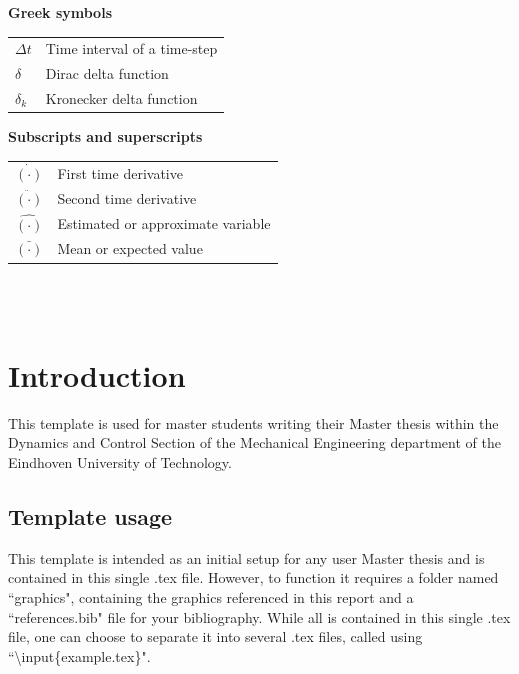 \documentclass[11pt]{report}
\numberwithin{equation}{chapter}		%
\numberwithin{figure}{chapter}			%
\numberwithin{table}{chapter}			%
\begin{document}
	\vspace{0.5cm}
	\noindent\textbf{Greek symbols}\\[3mm]
	\begin{tabularx}{\textwidth}{p{2.5cm}X}
		$\Delta t$         & Time interval of a time-step                   \\
		$\delta$           & Dirac delta function                           \\
		$\delta_k$         & Kronecker delta function                       
	\end{tabularx}

	\vspace{0.5cm}
	\noindent\textbf{Subscripts and superscripts}\\[3mm]
	\begin{tabularx}{\textwidth}{p{2.5cm}X}
		$\dot{(\cdot)}$    & First time derivative                          \\
		$\ddot{(\cdot)}$   & Second time derivative                         \\
		$\hat{(\cdot)}$    & Estimated or approximate variable              \\
		$\bar{(\cdot)}$    & Mean or expected value                         
	\end{tabularx}\\


	\newpage
	\thispagestyle{empty} \ \newpage

	\chapter{Introduction} \label{ch:Intro}
	This template is used for master students writing their Master thesis within the Dynamics and Control Section of the Mechanical Engineering department of the Eindhoven University of Technology. 

	\section{Template usage}
	This template is intended as an initial setup for any user Master thesis and is contained in this single .tex file. However, to function it requires a folder named ``graphics", containing the graphics referenced in this report and a ``references.bib" file for your bibliography. While all is contained in this single .tex file, one can choose to separate it into several .tex files, called using ``\textbackslash{}input\{example.tex\}".
\end{document}
